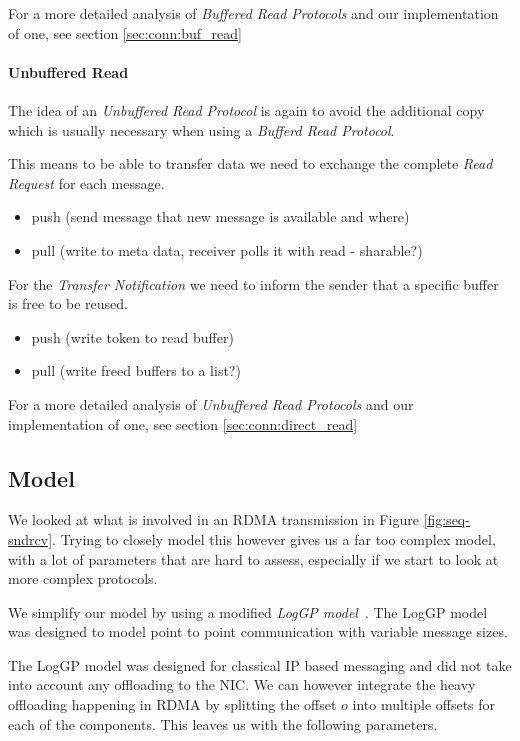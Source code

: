 For a more detailed analysis of \emph{Buffered Read Protocols} and our implementation of one, see section \ref{sec:conn:buf_read}

\paragraph{Unbuffered Read}
The idea of an \emph{Unbuffered Read Protocol} is again to avoid the additional copy which is usually necessary when using a
\emph{Bufferd Read Protocol}. 

This means to be able to transfer data we need to exchange the complete \emph{Read Request} for each message. 

\begin{itemize}
  \item push (send message that new message is available and where)
  \item pull (write to meta data, receiver polls it with read - sharable?)
\end{itemize}

For the \emph{Transfer Notification} we need to inform the sender that a specific buffer is free to be reused.

\begin{itemize}
  \item push (write token to read buffer)
  \item pull (write freed buffers to a list?)
\end{itemize}

For a more detailed analysis of \emph{Unbuffered Read Protocols} and our implementation of one, see section \ref{sec:conn:direct_read}

\pagebreak
\subsection{Model}
We looked at what is involved in an RDMA transmission in Figure \ref{fig:seq-sndrcv}.
Trying to closely model this however gives us a far too complex model, with a lot of parameters that are hard to assess,
especially if we start to look at more complex protocols. 

We simplify our model by using a modified \emph{LogGP model}~\cite{}. The LogGP model was designed to model point to point
communication with variable message sizes. 


The LogGP model was designed for classical IP based messaging and did not take into account any offloading to the NIC. We 
can however integrate the heavy offloading happening in RDMA by splitting the offset $o$ into multiple offsets for each
of the components. This leaves us with the following parameters.


